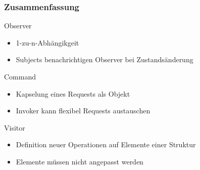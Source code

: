 \begin{frame}
  \frametitle{Zusammenfassung}
  \begin{block}{Observer}
	\begin{itemize}
		\item 1-zu-n-Abhängikgeit
		\item Subjects benachrichtigen Observer bei Zustandsänderung
	\end{itemize}
  \end{block}
  \begin{block}{Command}
	 \begin{itemize}
		\item Kapselung eines Requests als Objekt
		\item Invoker kann flexibel Requests austauschen
	 \end{itemize}
   \end{block}
  \begin{block}{Visitor}
	 \begin{itemize}
		\item Definition neuer Operationen auf Elemente einer Struktur
		\item Elemente müssen nicht angepasst werden
	 \end{itemize}
    \end{block}
\end{frame}
